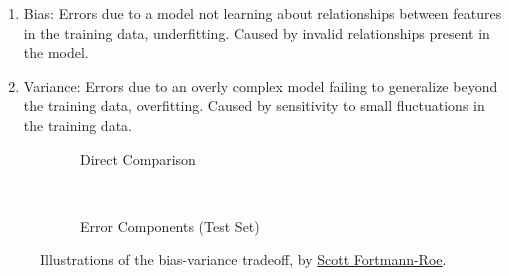 \begin{enumerate}[noitemsep]
  \item Bias: Errors due to a model not learning about relationships between features in the training data, \ie underfitting. Caused by invalid relationships present in the model.
  \item Variance: Errors due to an overly complex model failing to generalize beyond the training data, \ie overfitting. Caused by sensitivity to small fluctuations in the training data.
\end{enumerate}

\begin{figure}[H]
  \centering

  \begin{subfigure}[b]{0.48\textwidth}\centering
    \usebox{\largestimage}
    \vspace{0.01cm}
  \caption{Direct Comparison}
  \label{fig:ml:bias_variance_tradeoff:direct}
  \end{subfigure}
  ~
  \begin{subfigure}[b]{\wd\largestimage}\centering
  \caption{Error Components (Test Set)}
  \label{fig:ml:bias_variance_tradeoff:error}
  \end{subfigure}
\caption{
Illustrations of the bias-variance tradeoff,
by \href{http://scott.fortmann-roe.com/docs/BiasVariance.html}{Scott Fortmann-Roe}.
\label{fig:ml:bias_variance_tradeoff}
}
\end{figure}

